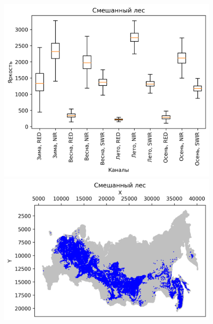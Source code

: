 \documentclass[14pt, a4paper, oneside]{extarticle}
\begin{document}
\begin{figure}[H]
    \centering
    \includegraphics[]{class-11-boxplot}
    \includegraphics[]{class-11-map}
\end{figure}
\end{document}
